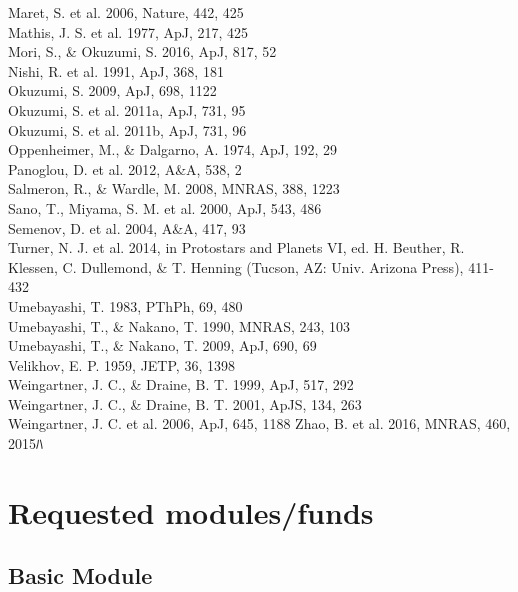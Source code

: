 \documentclass[10pt,fleqn,twoside]{article}
\newcommand{\Tcol}{\color{blue}}
\begin{document}
Maret, S. et al. 2006, Nature, 442, 425 \\ 
Mathis, J. S. et al. 1977, ApJ, 217, 425 \\
Mori, S., \& Okuzumi, S. 2016, ApJ, 817, 52 \\ 
Nishi, R. et al. 1991, ApJ, 368, 181 \\
Okuzumi, S. 2009, ApJ, 698, 1122 \\
Okuzumi, S. et al. 2011a, ApJ, 731, 95 \\
Okuzumi, S. et al. 2011b, ApJ, 731, 96 \\
Oppenheimer, M., \& Dalgarno, A. 1974, ApJ, 192, 29 \\
Panoglou, D. et al. 2012, A\&A, 538, 2 \\
Salmeron, R., \& Wardle, M. 2008, MNRAS, 388, 1223 \\
Sano, T., Miyama, S. M. et al. 2000, ApJ, 543, 486 \\
Semenov, D. et al. 2004, A\&A, 417, 93 \\
Turner, N. J. et al. 2014, in Protostars and Planets VI, ed. H. Beuther, R. Klessen, C. Dullemond, \& T. Henning (Tucson, AZ: Univ. Arizona Press), 411-432 \\
Umebayashi, T. 1983, PThPh, 69, 480 \\
Umebayashi, T., \& Nakano, T. 1990, MNRAS, 243, 103 \\
Umebayashi, T., \& Nakano, T. 2009, ApJ, 690, 69 \\
Velikhov, E. P. 1959, JETP, 36, 1398 \\
Weingartner, J. C., \& Draine, B. T. 1999, ApJ, 517, 292 \\
Weingartner, J. C., \& Draine, B. T. 2001, ApJS, 134, 263 \\
Weingartner, J. C. et al. 2006, ApJ, 645, 1188
Zhao, B. et al. 2016, MNRAS, 460, 2015ﾊ\\

\section{\Tcol Requested modules/funds}
\renewcommand{\leftmark}{\sc  Requested modules/funds}

\subsection{\Tcol Basic Module}
\end{document}

